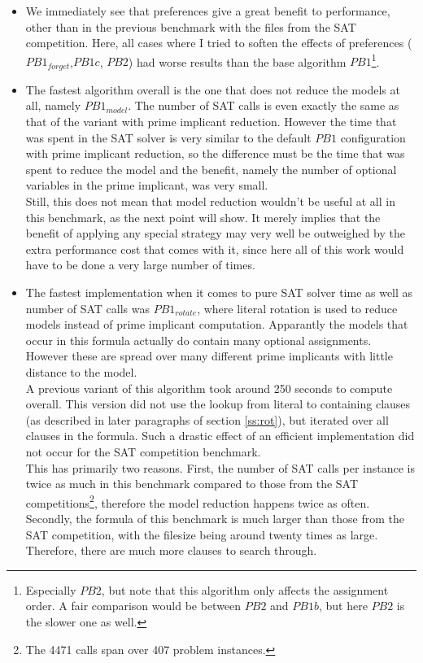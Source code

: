 \begin{itemize}
\item We immediately see that preferences give a great benefit to performance, other than in the previous benchmark with the files from the SAT competition. Here, all cases where I tried to soften the effects of preferences ($PB1_{forget}$,$PB1c$, $PB2$) had worse results than the base algorithm $PB1$\footnote{
	Especially $PB2$, but note that this algorithm only affects the assignment order. A fair comparison would be between $PB2$ and $PB1b$, but here $PB2$ is the slower one as well.
}. 
\item The fastest algorithm overall is the one that does not reduce the models at all, namely $PB1_{model}$. The number of SAT calls is even exactly the same as that of the variant with prime implicant reduction. However the time that was spent in the SAT solver is very similar to the default $PB1$ configuration with prime implicant reduction, so the difference must be the time that was spent to reduce the model and the benefit, namely the number of optional variables in the prime implicant, was very small.\\
Still, this does not mean that model reduction wouldn't be useful at all in this benchmark, as the next point will show. It merely implies that the benefit of applying any special strategy may very well be outweighed by the extra performance cost that comes with it, since here all of this work would have to be done a very large number of times.
\item The fastest implementation when it comes to pure SAT solver time as well as number of SAT calls was $PB1_{rotate}$, where literal rotation is used to reduce models instead of prime implicant computation. Apparantly the models that occur in this formula actually do contain many optional assignments. However these are spread over many different prime implicants with little distance to the model.\\
A previous variant of this algorithm took around 250 seconds to compute overall. This version did not use the lookup from literal to containing clauses (as described in later paragraphs of section \ref{ss:rot}), but iterated over all clauses in the formula. Such a drastic effect of an efficient implementation did not occur for the SAT competition benchmark.\\
This has primarily two reasons. First, the number of SAT calls per instance is twice as much in this benchmark compared to those from the SAT competitions\footnote{The 4471 calls span over 407 problem instances.}, therefore the model reduction happens twice as often. Secondly, the formula of this benchmark is much larger than those from the SAT competition, with the filesize being around twenty times as large. Therefore, there are much more clauses to search through.

\end{itemize}
